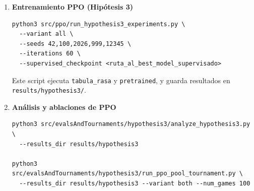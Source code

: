 \documentclass[12pt, a4paper]{article}
\begin{document}
\begin{enumerate}
    \item \textbf{Entrenamiento PPO (Hipótesis 3)}
\begin{lstlisting}
python3 src/ppo/run_hypothesis3_experiments.py \
  --variant all \
  --seeds 42,100,2026,999,12345 \
  --iterations 60 \
  --supervised_checkpoint <ruta_al_best_model_supervisado>
\end{lstlisting}
    Este script ejecuta \texttt{tabula\_rasa} y \texttt{pretrained}, y guarda resultados en \texttt{results/hypothesis3/}.

    \item \textbf{Análisis y ablaciones de PPO}
\begin{lstlisting}
python3 src/evalsAndTournaments/hypothesis3/analyze_hypothesis3.py \
  --results_dir results/hypothesis3

python3 src/evalsAndTournaments/hypothesis3/run_ppo_pool_tournament.py \
  --results_dir results/hypothesis3 --variant both --num_games 100
\end{lstlisting}
\end{enumerate}
\end{document}
